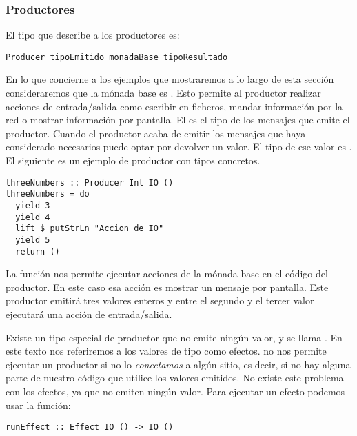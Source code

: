 \subsubsection{Productores}
El tipo que describe a los productores es:
\begin{verbatim}
Producer tipoEmitido monadaBase tipoResultado
\end{verbatim}
En lo que concierne a los ejemplos que mostraremos a lo largo de esta
sección consideraremos que la mónada base es . Esto permite al
productor realizar acciones de entrada/salida como escribir en ficheros,
mandar información por la red o mostrar información por pantalla. El
 es el tipo de los mensajes que emite el productor.
Cuando el productor acaba de emitir los mensajes que haya
considerado necesarios puede optar por devolver un valor. El tipo de
ese valor es . El siguiente es un ejemplo de
productor con tipos concretos.
\begin{verbatim}
threeNumbers :: Producer Int IO ()
threeNumbers = do
  yield 3
  yield 4
  lift $ putStrLn "Accion de IO"
  yield 5
  return ()
\end{verbatim}
La función  nos permite ejecutar acciones de la mónada
base en el código del productor. En este caso esa acción es mostrar
un mensaje por pantalla. Este productor emitirá tres valores enteros
y entre el segundo y el tercer valor ejecutará una acción de
entrada/salida.

Existe un tipo especial de productor que no emite ningún valor,
y se llama . En este texto nos referiremos a los valores
de tipo  como efectos.  no nos permite ejecutar
un productor si no lo \textit{conectamos} a algún sitio, es decir,
si no hay alguna parte de nuestro código que utilice los valores
emitidos. No existe este problema con los efectos, ya que no emiten
ningún valor. Para ejecutar un efecto podemos usar la función:
\begin{verbatim}
runEffect :: Effect IO () -> IO ()
\end{verbatim}

